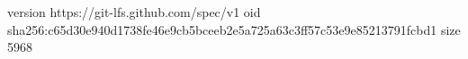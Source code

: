 version https://git-lfs.github.com/spec/v1
oid sha256:c65d30e940d1738fe46e9cb5bceeb2e5a725a63c3ff57c53e9e85213791fcbd1
size 5968
